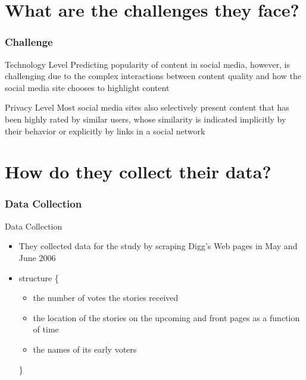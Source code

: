 \documentclass[aspectratio=43]{beamer}
\begin{document}
\section[Challenge]{What are the challenges they face?}
\begin{frame}
\frametitle{Challenge}
\centering
\begin{minipage}{\textwidth}
\begin{exampleblock}{Technology Level}
Predicting popularity of content in social media, however, is challenging due to the complex interactions between content quality and how the social media site chooses to highlight content
\end{exampleblock}
\begin{block}{Privacy Level}
Most social media sites also selectively present content that has been highly rated by similar users, whose similarity is indicated implicitly by their behavior or explicitly by links in a social network
\end{block}
\end{minipage}
\end{frame}

\section[Data]{How do they collect their data?}
\begin{frame}
\frametitle{Data Collection}
\centering
\begin{minipage}{\textwidth}
\begin{block}{Data Collection}
\begin{itemize}
\item They collected data for the study by scraping Digg's Web pages in May and June 2006
\item structure \{
  \begin{itemize}
  \item the number of votes the stories received
  \item the location of the stories on the upcoming and front pages as a function of time
  \item the names of its early voters
  \end{itemize}
  \}
\end{itemize}
\end{block}
\end{minipage}
\end{frame}
\end{document}

